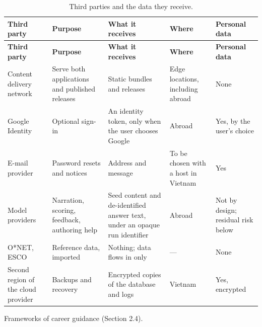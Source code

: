 {\small{}\renewcommand{\arraystretch}{1.1}
\begin{longtable}{|>{\raggedright\arraybackslash}p{}|>{\raggedright\arraybackslash}p{}|>{\raggedright\arraybackslash}p{}|>{\raggedright\arraybackslash}p{}|>{\raggedright\arraybackslash}p{}|}
\caption{Third parties and the data they receive.} \\
\hline
\textbf{Third party} & \textbf{Purpose} & \textbf{What it receives} & \textbf{Where} & \textbf{Personal data} \\ \hline
\endfirsthead
\hline
\textbf{Third party} & \textbf{Purpose} & \textbf{What it receives} & \textbf{Where} & \textbf{Personal data} \\ \hline
\endhead
Content delivery network & Serve both applications and published releases & Static bundles and releases & Edge locations, including abroad & None \\ \hline
Google Identity & Optional sign-in & An identity token, only when the user chooses Google & Abroad & Yes, by the user's choice \\ \hline
E-mail provider & Password resets and notices & Address and message & To be chosen with a host in Vietnam & Yes \\ \hline
Model providers & Narration, scoring, feedback, authoring help & Seed content and de-\allowbreak{}identified answer text, under an opaque run identifier & Abroad & Not by design; residual risk below \\ \hline
O*NET, ESCO & Reference data, imported & Nothing; data flows in only & --- & None \\ \hline
Second region of the cloud provider & Backups and recovery & Encrypted copies of the database and logs & Vietnam & Yes, encrypted \\ \hline
\end{longtable}
}

Frameworks of career guidance (Section 2.4).

